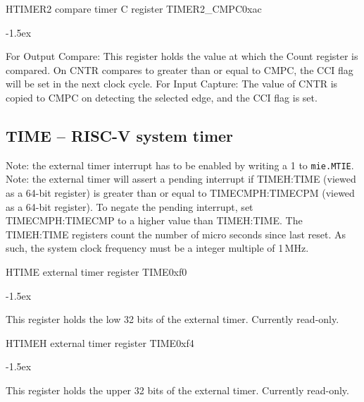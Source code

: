 \documentclass[12pt]{article}
\begin{document}
\begin{register}{H}{TIMER2 compare timer C register TIMER2\_CMPC}{0xac}
\label{timer2cmpc}
%
\regnewline%
\end{register}
\begin{regdesc}[0.8\textwidth]\begin{reglist}[00000]
\itemsep-1.5ex
\item[CMPC] For Output Compare: This register holds the value at which the Count register is compared. On CNTR compares to greater than or equal to CMPC, the CCI flag will be set in the next clock cycle. For Input Capture: The value of CNTR is copied to CMPC on detecting the selected edge, and the CCI flag is set.
\end{reglist}\end{regdesc}

\subsection{TIME -- RISC-V system timer}
Note: the external timer interrupt has to be enabled by writing a 1 to \lstinline[breaklines=false]|mie.MTIE|.
Note: the external timer will assert a pending interrupt if TIMEH:TIME (viewed as a 64-bit register) is greater than or equal to TIMECMPH:TIMECPM (viewed as a 64-bit register). To negate the pending interrupt, set TIMECMPH:TIMECMP to a higher value than TIMEH:TIME. The TIMEH:TIME registers count the number of micro seconds since last reset. As such, the system clock frequency must be a integer multiple of 1\,MHz.

\begin{register}{H}{TIME external timer register TIME}{0xf0}
\label{time}
\regnewline%
\end{register}
\begin{regdesc}[0.8\textwidth]\begin{reglist}[00000]
\itemsep-1.5ex
\item [TIME] This register holds the low 32 bits of the external timer. Currently read-only.
\end{reglist}\end{regdesc}

\begin{register}{H}{TIMEH external timer register TIME}{0xf4}
\label{timeh}
\regnewline%
\end{register}
\begin{regdesc}[0.8\textwidth]\begin{reglist}[00000]
\itemsep-1.5ex
\item [TIMEH] This register holds the upper 32 bits of the external timer. Currently read-only.
\end{reglist}\end{regdesc}
\end{document}
